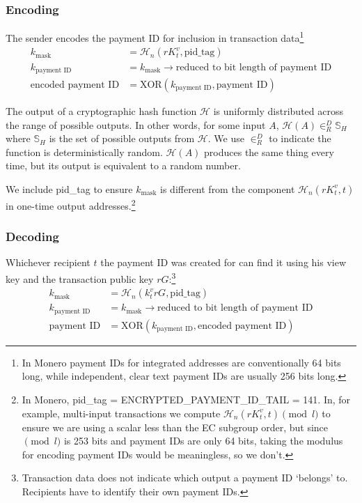 \subsubsection*{Encoding}

The sender encodes the payment ID for inclusion in transaction data\footnote{In Monero payment IDs for integrated addresses are conventionally 64 bits long, while independent, clear text payment IDs are usually 256 bits long.}\vspace{.3cm}
\begin{align*}
         k_{\textrm{mask}} &= \mathcal{H}_n(r K_t^v,\textrm{pid\_tag}) \\
      k_{\textrm{payment ID}} &= k_{\textrm{mask}} \rightarrow \textrm{reduced to bit length of payment ID}\\
  \textrm{encoded payment ID} &= \textrm{XOR}(k_{\textrm{payment ID}}, \textrm{payment ID})
\end{align*}

The output of a cryptographic hash function $\mathcal{H}$ is uniformly distributed across the range of possible outputs. In other words, for some input $A$, $\mathcal{H}(A) \in^D_R \mathbb{S}_H$ where $\mathbb{S}_H$ is the set of possible outputs from $\mathcal{H}$. We use $\in^D_R$ to indicate the function is deterministically random. $\mathcal{H}(A)$ produces the same thing every time, but its output is equivalent to a random number.

We include pid\_tag to ensure $k_{\textrm{mask}}$ is different from the component $\mathcal{H}_n(r K_t^v, t)$ in one-time output addresses.\footnote{In Monero, pid\_tag = ENCRYPTED\_PAYMENT\_ID\_TAIL = 141. In, for example, multi-input transactions we compute $\mathcal{H}_n(r K_t^v, t) \pmod l$ to ensure we are using a scalar less than the EC subgroup order, but since$\pmod l$ is 253 bits and payment IDs are only 64 bits, taking the modulus for encoding payment IDs would be meaningless, so we don't.}

\subsubsection*{Decoding}

Whichever recipient $t$ the payment ID was created for can find it using his view key and the transaction public key $r G$:\footnote{Transaction data does not indicate which output a payment ID `belongs' to. Recipients have to identify their own payment IDs.} \\
\begin{align*}
         k_{\textrm{mask}} &= \mathcal{H}_n(k_t^v r G,\textrm{pid\_tag}) \\
      k_{\textrm{payment ID}} &= k_{\textrm{mask}} \rightarrow \textrm{reduced to bit length of payment ID}\\
          \textrm{payment ID} &= \textrm{XOR}(k_{\textrm{payment ID}}, \textrm{encoded payment ID})
\end{align*}

